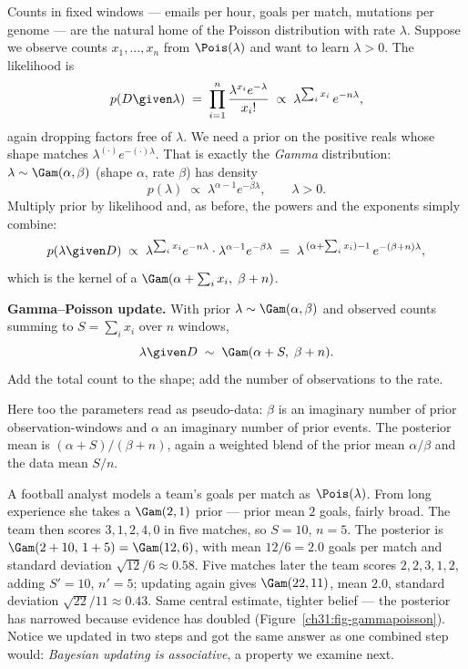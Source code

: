 Counts in fixed windows --- emails per hour, goals per match, mutations per genome --- are
the natural home of the Poisson distribution with rate $\lambda$. Suppose we observe counts
$x_1,\dots,x_n$ from $\Pois(\lambda)$ and want to learn $\lambda > 0$. The likelihood is
\[
  p(D \given \lambda) \;=\; \prod_{i=1}^{n}\frac{\lambda^{x_i}e^{-\lambda}}{x_i!}
  \;\propto\; \lambda^{\sum_i x_i}\, e^{-n\lambda},
\]
again dropping factors free of $\lambda$. We need a prior on the positive reals whose shape
matches $\lambda^{(\cdot)}e^{-(\cdot)\lambda}$. That is exactly the \emph{Gamma}
distribution: $\lambda\sim\Gam(\alpha,\beta)$ (shape $\alpha$, rate $\beta$) has density
\[
  p(\lambda) \;\propto\; \lambda^{\alpha-1}e^{-\beta\lambda},\qquad \lambda>0.
\]
Multiply prior by likelihood and, as before, the powers and the exponents simply combine:
\[
  p(\lambda\given D)\;\propto\;
  \lambda^{\sum_i x_i}e^{-n\lambda}\cdot\lambda^{\alpha-1}e^{-\beta\lambda}
  \;=\;\lambda^{\,(\alpha + \sum_i x_i)-1}\,e^{-(\beta + n)\lambda},
\]
which is the kernel of a $\Gam(\alpha + \sum_i x_i,\; \beta + n)$.

\begin{formalbox}
\textbf{Gamma--Poisson update.} With prior $\lambda\sim\Gam(\alpha,\beta)$ and observed
counts summing to $S=\sum_i x_i$ over $n$ windows,
\begin{equation}
  \lambda\given D \;\sim\; \Gam(\alpha + S,\; \beta + n).
  \label{ch31:gamma-update}
\end{equation}
Add the total count to the shape; add the number of observations to the rate.
\end{formalbox}

Here too the parameters read as pseudo-data: $\beta$ is an imaginary number of prior
observation-windows and $\alpha$ an imaginary number of prior events. The posterior mean is
$(\alpha + S)/(\beta + n)$, again a weighted blend of the prior mean $\alpha/\beta$ and the
data mean $S/n$.

\begin{example}
\label{ch31:ex-goals}
A football analyst models a team's goals per match as $\Pois(\lambda)$. From long
experience she takes a $\Gam(2,1)$ prior --- prior mean $2$ goals, fairly broad. The team
then scores $3, 1, 2, 4, 0$ in five matches, so $S=10$, $n=5$. The posterior is
$\Gam(2+10,\,1+5)=\Gam(12,6)$, with mean $12/6 = 2.0$ goals per match and standard
deviation $\sqrt{12}/6 \approx 0.58$. Five matches later the team scores $2,2,3,1,2$,
adding $S'=10$, $n'=5$; updating again gives $\Gam(22,11)$, mean $2.0$, standard deviation
$\sqrt{22}/11\approx 0.43$. Same central estimate, tighter belief --- the posterior has
narrowed because evidence has doubled (Figure~\ref{ch31:fig-gammapoisson}). Notice we updated in two steps and got the same
answer as one combined step would: \emph{Bayesian updating is associative}, a property we
examine next.
\end{example}

